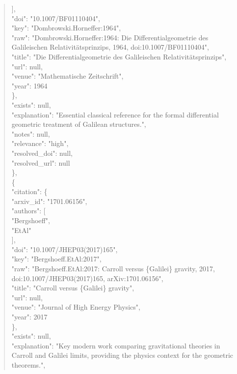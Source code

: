 \documentclass[11pt]{article}
\begin{document}
\begin{quote}
        ],\\
        "doi": "10.1007/BF01110404",\\
        "key": "Dombrowski.Horneffer:1964",\\
        "raw": "Dombrowski.Horneffer:1964: Die Differentialgeometrie des Galileischen Relativitätsprinzips, 1964, doi:10.1007/BF01110404",\\
        "title": "Die Differentialgeometrie des Galileischen Relativitätsprinzips",\\
        "url": null,\\
        "venue": "Mathematische Zeitschrift",\\
        "year": 1964\\
      \},\\
      "exists": null,\\
      "explanation": "Essential classical reference for the formal differential geometric treatment of Galilean structures.",\\
      "notes": null,\\
      "relevance": "high",\\
      "resolved\_doi": null,\\
      "resolved\_url": null\\
    \},\\
    \{\\
      "citation": \{\\
        "arxiv\_id": "1701.06156",\\
        "authors": [\\
          "Bergshoeff",\\
          "EtAl"\\
        ],\\
        "doi": "10.1007/JHEP03(2017)165",\\
        "key": "Bergshoeff.EtAl:2017",\\
        "raw": "Bergshoeff.EtAl:2017: Carroll versus \{Galilei\} gravity, 2017, doi:10.1007/JHEP03(2017)165, arXiv:1701.06156",\\
        "title": "Carroll versus \{Galilei\} gravity",\\
        "url": null,\\
        "venue": "Journal of High Energy Physics",\\
        "year": 2017\\
      \},\\
      "exists": null,\\
      "explanation": "Key modern work comparing gravitational theories in Carroll and Galilei limits, providing the physics context for the geometric theorems.",\\

\end{quote}
\end{document}

